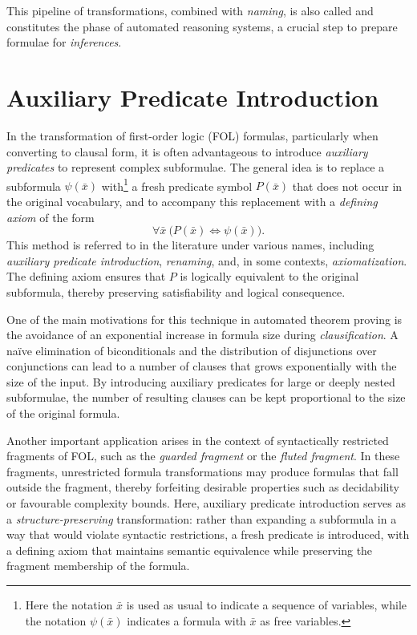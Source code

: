 This pipeline of transformations, combined with \emph{naming}, is also called  and  constitutes the  phase of automated reasoning systems, a crucial step to prepare formulae for \emph{inferences}.

\section{Auxiliary Predicate Introduction}\label{sec:auxiliary_predicate_introduction}

In the transformation of first-order logic (FOL) formulas, particularly when converting to clausal form, it is often advantageous to introduce \emph{auxiliary predicates} to represent complex subformulae. The general idea is to replace a subformula \(\psi(\bar{x})\) with\footnote{Here the notation \(\bar{x}\) is used as usual to indicate a sequence of variables, while the notation \(\psi(\bar{x})\) indicates a formula with \(\bar{x}\) as free variables.} a fresh predicate symbol \(P(\bar{x})\) that does not occur in the original vocabulary, and to accompany this replacement with a \emph{defining axiom} of the form
\[
\forall \bar{x}\ \big(P(\bar{x}) \iff \psi(\bar{x})\big).
\]
This method is referred to in the literature under various names, including \emph{auxiliary predicate introduction}, \emph{renaming}, and, in some contexts, \emph{axiomatization}. The defining axiom ensures that \(P\) is logically equivalent to the original subformula, thereby preserving satisfiability and logical consequence.

One of the main motivations for this technique in automated theorem proving is the avoidance of an exponential increase in formula size during \emph{clausification}.
A naïve elimination of biconditionals and the distribution of disjunctions over conjunctions can lead to a number of clauses that grows exponentially with the size of the input.
By introducing auxiliary predicates for large or deeply nested subformulae, the number of resulting clauses can be kept proportional to the size of the original formula.

Another important application arises in the context of syntactically restricted fragments of FOL, such as the \emph{guarded fragment} or the \emph{fluted fragment}.
In these fragments, unrestricted formula transformations may produce formulas that fall outside the fragment, thereby forfeiting desirable properties such as decidability or favourable complexity bounds.
Here, auxiliary predicate introduction serves as a \emph{structure-preserving} transformation: rather than expanding a subformula in a way that would violate syntactic restrictions, a fresh predicate is introduced, with a defining axiom that maintains semantic equivalence while preserving the fragment membership of the formula.

